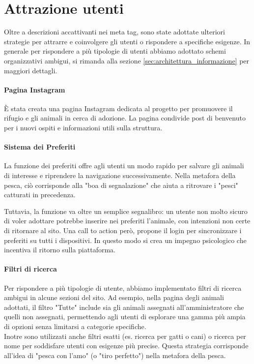 \section{Attrazione utenti}
\label{sec:attrazione_utenti}

Oltre a descrizioni accattivanti nei meta tag, sono state adottate ulteriori strategie per attrarre e coinvolgere gli utenti o rispondere a specifiche esigenze.
In generale per rispondere a più tipologie di utenti abbiamo adottato schemi organizzativi ambigui, si rimanda alla sezione \ref{sec:architettura_informazione} per maggiori dettagli.
\paragraph{Pagina Instagram}
È stata creata una pagina Instagram dedicata al progetto per promuovere il rifugio e gli animali in cerca di adozione. La pagina condivide post di benvenuto per i nuovi ospiti e informazioni utili sulla struttura.

\paragraph{Sistema dei Preferiti}
La funzione dei preferiti offre agli utenti un modo rapido per salvare gli animali di interesse e riprendere la navigazione successivamente. Nella metafora della pesca, ciò corrisponde alla "boa di segnalazione" che aiuta a ritrovare i "pesci" catturati in precedenza.

Tuttavia, la funzione va oltre un semplice segnalibro: un utente non molto sicuro di voler adottare potrebbe inserire nei preferiti l'animale, con intenzioni non certe di ritornare al sito. Una call to action però, propone il login per sincronizzare i preferiti su tutti i dispositivi. In questo modo si crea un impegno psicologico che incentiva il ritorno sulla piattaforma.

\paragraph{Filtri di ricerca}
Per rispondere a più tipologie di utente, abbiamo implementato filtri di ricerca ambigui in alcune sezioni del sito. Ad esempio, nella pagina degli animali adottati, il filtro "Tutte" include sia gli animali assegnati all'amministratore che quelli non assegnati, permettendo agli utenti di esplorare una gamma più ampia di opzioni senza limitarsi a categorie specifiche.\\
Inotre sono utilizzati anche filtri esatti (es. ricerca per gatti o cani) o ricerca per nome per soddisfare utenti con esigenze più precise.
Questa strategia corrisponde all'idea di "pesca con l'amo" (o "tiro perfetto") nella metafora della pesca.

